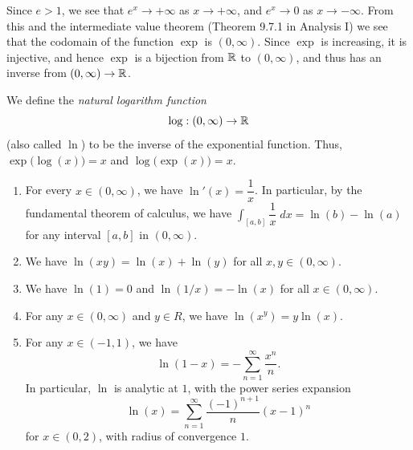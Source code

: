\begin{note}
  Since \(e > 1\), we see that \(e^x \to +\infty\) as \(x \to +\infty\), and \(e^x \to 0\) as \(x \to -\infty\).
  From this and the intermediate value theorem (Theorem 9.7.1 in Analysis I) we see that the codomain of the function \(\exp\) is \((0, \infty)\).
  Since \(\exp\) is increasing, it is injective, and hence \(\exp\) is a bijection from \(\mathbb{R}\) to \((0, \infty)\), and thus has an inverse from \((0, \infty) \to \mathbb{R}\).
\end{note}

\begin{defn}[Logarithm]\label{ii:4.5.5}
  We define the \emph{natural logarithm function}
  \[
    \log : (0, \infty) \to \mathbb{R}
  \]
  (also called \(\ln\)) to be the inverse of the exponential function.
  Thus, \(\exp\big(\log(x)\big) = x\) and \(\log\big(\exp(x)\big) = x\).
\end{defn}

\begin{thm}\label{ii:4.5.6}
  \quad
  \begin{enumerate}
    \item\label{ii:4.5.6.a} For every \(x \in (0, \infty)\), we have \(\ln'(x) = \dfrac{1}{x}\).
    In particular, by the fundamental theorem of calculus, we have \(\int_{[a, b]} \dfrac{1}{x} \; dx = \ln(b) - \ln(a)\) for any interval \([a, b]\) in \((0, \infty)\).
    \item\label{ii:4.5.6.b} We have \(\ln(xy) = \ln(x) + \ln(y)\) for all \(x, y \in (0, \infty)\).
    \item\label{ii:4.5.6.c} We have \(\ln(1) = 0\) and \(\ln(1 / x) = -\ln(x)\) for all \(x \in (0, \infty)\).
    \item\label{ii:4.5.6.d} For any \(x \in (0, \infty)\) and \(y \in R\), we have \(\ln(x^y) = y \ln(x)\).
    \item\label{ii:4.5.6.e} For any \(x \in (-1, 1)\), we have
    \[
      \ln(1 - x) = - \sum_{n = 1}^\infty \dfrac{x^n}{n}.
    \]
    In particular, \(\ln\) is analytic at \(1\), with the power series expansion
    \[
      \ln(x) = \sum_{n = 1}^\infty \dfrac{(-1)^{n + 1}}{n} (x - 1)^n
    \]
    for \(x \in (0, 2)\), with radius of convergence \(1\).
  \end{enumerate}
\end{thm}

